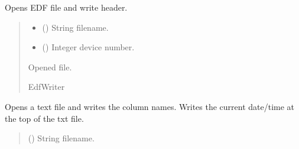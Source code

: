 \documentclass[letterpaper,10pt,english]{sphinxmanual}
\begin{document}
\begin{fulllineitems}
\begin{fulllineitems}
\end{fulllineitems}


\begin{fulllineitems}
\label{\detokenize{Setup.SetupOneDevice:Setup.SetupOneDevice.Setup_PodInterface.SetupInterface._OpenSaveFile_EDF}}
\pysigstartsignatures
{}
\pysigstopsignatures
\sphinxAtStartPar
Opens EDF file and write header.
\begin{quote}\begin{description}
\begin{itemize}
\item {} 
\sphinxAtStartPar
{} () \textendash{} String filename.

\item {} 
\sphinxAtStartPar
{} () \textendash{} Integer device number.

\end{itemize}

\sphinxAtStartPar
Opened file.

\sphinxAtStartPar
EdfWriter

\end{description}\end{quote}

\end{fulllineitems}


\begin{fulllineitems}
\label{\detokenize{Setup.SetupOneDevice:Setup.SetupOneDevice.Setup_PodInterface.SetupInterface._OpenSaveFile_TXT}}
\pysigstartsignatures
{}
\pysigstopsignatures
\sphinxAtStartPar
Opens a text file and writes the column names. Writes the current date/time at the top of         the txt file.
\begin{quote}\begin{description}
\sphinxAtStartPar
{} () \textendash{} String filename.


\end{description}
\end{quote}
\end{fulllineitems}
\end{fulllineitems}
\end{document}
